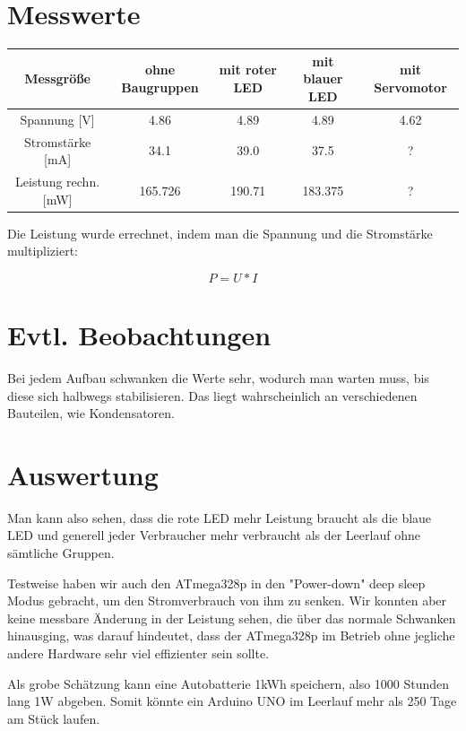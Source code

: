 \documentclass[8pt, letterpaper]{article}
\begin{document}
\section{Messwerte}
\begin{center}
\begin{tabular}{ |c|c|c|c|c| }
  Messgröße & ohne Baugruppen & mit roter LED & mit blauer LED & mit Servomotor \\
  \hline
  Spannung [V] & 4.86 & 4.89 & 4.89 & 4.62 \\
  \hline
  Stromstärke [mA] & 34.1 & 39.0 & 37.5 & ? \\
  \hline
  Leistung rechn. [mW] & 165.726 & 190.71 & 183.375 & ? \\
  \hline
\end{tabular}
\end{center}

Die Leistung wurde errechnet, indem man die Spannung und die Stromstärke multipliziert:

\[ P = U * I \]

\section{Evtl. Beobachtungen}
Bei jedem Aufbau schwanken die Werte sehr, wodurch man warten muss, bis diese sich halbwegs stabilisieren. Das liegt wahrscheinlich an verschiedenen Bauteilen, wie Kondensatoren.

\section{Auswertung}
Man kann also sehen, dass die rote LED mehr Leistung braucht als die blaue LED und generell jeder Verbraucher mehr verbraucht als der Leerlauf ohne sämtliche Gruppen.

Testweise haben wir auch den ATmega328p in den "Power-down" deep sleep Modus gebracht, um den Stromverbrauch von ihm zu senken. Wir konnten aber keine messbare Änderung in der Leistung sehen, die über das normale Schwanken hinausging, was darauf hindeutet, dass der ATmega328p im Betrieb ohne jegliche andere Hardware sehr viel effizienter sein sollte.

Als grobe Schätzung kann eine Autobatterie 1kWh speichern, also 1000 Stunden lang 1W abgeben. Somit könnte ein Arduino UNO im Leerlauf mehr als 250 Tage am Stück laufen.
\end{document}
